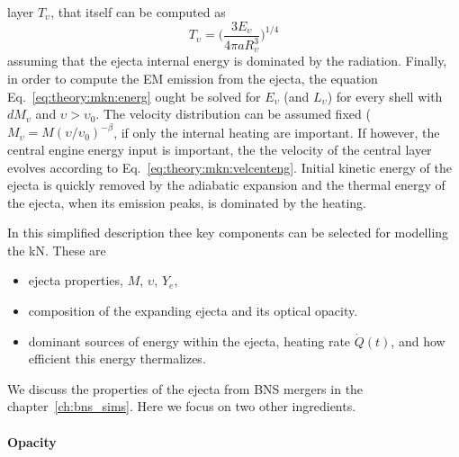 layer $T_{\upsilon}$, that itself can be computed as 
%
\begin{equation}
T_{\upsilon} = \Bigg(\frac{3E_{\upsilon}}{4\pi a R^{3}_{\upsilon}}\Bigg)^{1/4}
\end{equation}
%
assuming that the ejecta internal energy is dominated by the radiation. 
%
%
Finally, in order to compute the \ac{EM} emission from the ejecta, 
the equation Eq.~\eqref{eq:theory:mkn:energ} ought be solved for $E_{\upsilon}$ (and $L_{\upsilon}$) 
for every shell with $dM_{\upsilon}$ and $\upsilon>\upsilon_0$. 
%
The velocity distribution can be assumed fixed (\eg $M_{\upsilon} = M(\upsilon/\upsilon_0)^{-\beta}$,  
if only the internal heating are important. If however, the central engine energy input is important, 
the the velocity of the central layer evolves according to Eq.~\eqref{eq:theory:mkn:velcenteng}.
%
Initial kinetic energy of the ejecta is quickly removed by the adiabatic expansion and the 
thermal energy of the ejecta, when its emission peaks, is dominated by the heating.


In this simplified description thee key 
components can be selected for modelling the \ac{kN}.
These are 
\begin{itemize}
    \item ejecta properties, $M$, $\upsilon$, $Y_e$,
    \item composition of the expanding ejecta and its optical opacity.
    \item dominant sources of energy within the ejecta, heating rate $\dot{Q}(t)$, and how 
    efficient this energy thermalizes.
\end{itemize}
%
We discuss the properties of the ejecta from \ac{BNS} mergers in the chapter~\ref{ch:bns_sims}.
Here we focus on two other ingredients.




\paragraph{Opacity}

